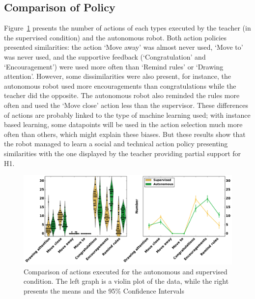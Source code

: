 \subsection{Comparison of Policy}

Figure~\ref{fig:tutoring_actions_distribution} presents the number of actions of each types executed by the teacher (in the supervised condition) and the autonomous robot. Both action policies presented similarities: the action `Move away' was almost never used, `Move to' was never used, and the supportive feedback (`Congratulation' and `Encouragement') were used more often than `Remind rules' or `Drawing attention'. However, some dissimilarities were also present, for instance, the autonomous robot used more encouragements than congratulations while the teacher did the opposite. The autonomous robot also reminded the rules more often and used the `Move close' action less than the supervisor. These differences of actions are probably linked to the type of machine learning used; with instance based learning, some datapoints will be used in the action selection much more often than others, which might explain these biases. But these results show that the robot managed to learn a social and technical action policy presenting similarities with the one displayed by the teacher providing partial support for H1.

\begin{figure}[ht]
	\includegraphics[width=1\linewidth]{actions.pdf}
	\centering
	\caption{Comparison of actions executed for the autonomous and supervised condition. The left graph is a violin plot of the data, while the right presents the means and the 95\% Confidence Intervals}
	\label{fig:tutoring_actions_distribution}
\end{figure}


